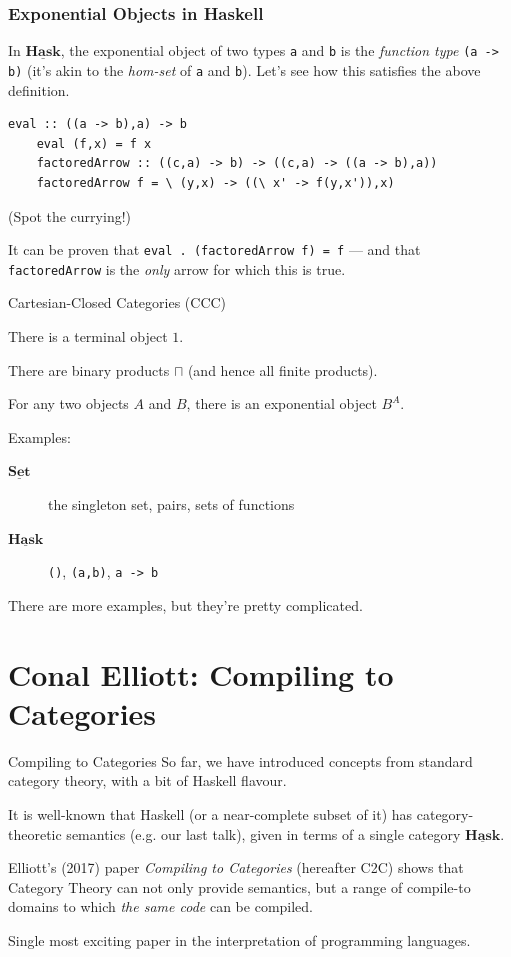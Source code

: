 \documentclass[10pt]{beamer}
\newcommand{\Cat}[1]{\ensuremath{\underline{\mathbf{#1}}}}
\theoremstyle{definition}
\theoremstyle{remark}
\numberwithin{equation}{section}
\begin{document}
\begin{frame}
  \frametitle{Exponential Objects in Haskell}

  In $\Cat{Hask}$, the exponential object of two types \lstinline{a} and
  \lstinline{b} is the \emph{function type} \lstinline{(a -> b)} (it's akin to
  the \emph{hom-set} of \lstinline{a} and \lstinline{b}). Let's see
  how this satisfies the above definition.

  \begin{lstlisting}[frame=single]
    eval :: ((a -> b),a) -> b
    eval (f,x) = f x
    factoredArrow :: ((c,a) -> b) -> ((c,a) -> ((a -> b),a))
    factoredArrow f = \ (y,x) -> ((\ x' -> f(y,x')),x)
  \end{lstlisting}
  {\footnotesize{(Spot the currying!)}}

  It can be proven that \lstinline{eval . (factoredArrow f) = f} --- and that
  \lstinline{factoredArrow} is the \emph{only} arrow for which this is true.

\end{frame}

\begin{frame}[fragile]{Cartesian-Closed Categories (CCC)}

  There is a terminal object $1$.

  There are binary products $\sqcap$ (and hence all finite products).

  For any two objects $A$ and $B$, there is an exponential object $B^A$.

  Examples:
  \begin{description}
    \item[\Cat{Set}] the singleton set, pairs, sets of functions
    \item[\Cat{Hask}] \lstinline{()}, \lstinline{(a,b)}, \lstinline{a -> b}
  \end{description}

  There are more examples, but they're pretty complicated.

\end{frame}

\section{Conal Elliott: Compiling to Categories} %

\begin{frame}[fragile]{Compiling to Categories}
  So far, we have introduced concepts from standard category theory, with a bit of Haskell flavour.

  It is well-known that Haskell (or a near-complete subset of it) has category-theoretic semantics (e.g. our last talk), given in terms of a single category $\Cat{Hask}$.

  Elliott's (2017) paper \emph{Compiling to Categories} (hereafter C2C) shows that Category Theory can not only provide semantics, but a range of compile-to domains to which \emph{the same code} can be compiled.

  Single most exciting paper in the interpretation of programming languages.
\end{frame}
\end{document}
